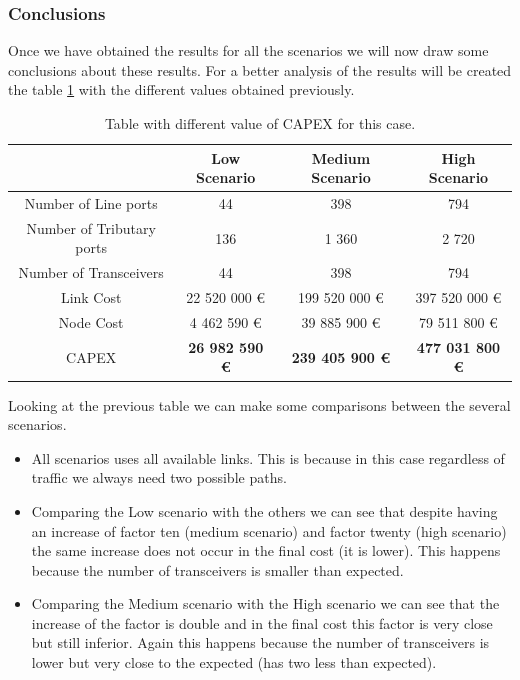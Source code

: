 \subsubsection{Conclusions}

Once we have obtained the results for all the scenarios we will now draw some conclusions about these results. For a better analysis of the results will be created the table \ref{table_comparative_opaque_protec} with the different values obtained previously.

\begin{table}[h!]
\centering
\begin{tabular}{| c | c | c | c |}
 \hline
   & Low Scenario & Medium Scenario  & High Scenario \\
 \hline\hline
 Number of Line ports & 44 & 398 & 794 \\ \hline
 Number of Tributary ports & 136 & 1 360 & 2 720 \\ \hline
 Number of Transceivers & 44 & 398 & 794 \\ \hline
 Link Cost & 22 520 000 \euro & 199 520 000 \euro & 397 520 000 \euro \\ \hline
 Node Cost & 4 462 590 \euro & 39 885 900 \euro & 79 511 800 \euro \\ \hline
 CAPEX & \textbf{26 982 590 \euro} & \textbf{239 405 900 \euro} & \textbf{477 031 800 \euro} \\
 \hline
\end{tabular}
\caption{Table with different value of CAPEX for this case.}
\label{table_comparative_opaque_protec}
\end{table}

Looking at the previous table we can make some comparisons between the several scenarios.

\begin{itemize}
  \item All scenarios uses all available links.
  \subitem This is because in this case regardless of traffic we always need two possible paths.
  \item Comparing the Low scenario with the others we can see that despite having an increase of factor ten (medium scenario) and factor twenty (high scenario) the same increase does not occur in the final cost (it is lower).
  \subitem This happens because the number of transceivers is smaller than expected.
  \item Comparing the Medium scenario with the High scenario we can see that the increase of the factor is double and in the final cost this factor is very close but still inferior.
  \subitem Again this happens because the number of transceivers is lower but very close to the expected (has two less than expected).
\end{itemize}


